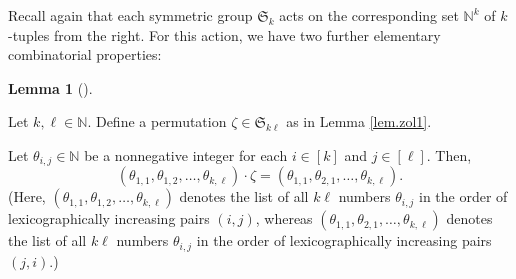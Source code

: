 \documentclass[numbers=enddot,12pt,final,onecolumn,notitlepage]{scrartcl}%
\theoremstyle{definition}
\newtheorem{lem}[theo]{Lemma}
\newenvironment{lemma}[1][]
{\begin{lem}[#1]\begin{leftbar}}
{\end{leftbar}\end{lem}}
\begin{document}
Recall again that each symmetric group $\mathfrak{S}_{k}$ acts on the
corresponding set $\mathbb{N}^{k}$ of $k$-tuples from the right. For this
action, we have two further elementary combinatorial properties:

\begin{lemma}
\label{lem.tup-zeta}Let $k,\ell\in\mathbb{N}$. Define a permutation $\zeta
\in\mathfrak{S}_{k\ell}$ as in Lemma \ref{lem.zol1}.

Let $\theta_{i,j}\in\mathbb{N}$ be a nonnegative integer for each $i\in\left[
k\right]  $ and $j\in\left[  \ell\right]  $. Then,%
\[
\left(  \theta_{1,1},\theta_{1,2},\ldots,\theta_{k,\ell}\right)  \cdot
\zeta=\left(  \theta_{1,1},\theta_{2,1},\ldots,\theta_{k,\ell}\right)  .
\]
(Here, $\left(  \theta_{1,1},\theta_{1,2},\ldots,\theta_{k,\ell}\right)  $
denotes the list of all $k\ell$ numbers $\theta_{i,j}$ in the order of
lexicographically increasing pairs $\left(  i,j\right)  $, whereas $\left(
\theta_{1,1},\theta_{2,1},\ldots,\theta_{k,\ell}\right)  $ denotes the list of
all $k\ell$ numbers $\theta_{i,j}$ in the order of lexicographically
increasing pairs $\left(  j,i\right)  $.)
\end{lemma}
\end{document}
